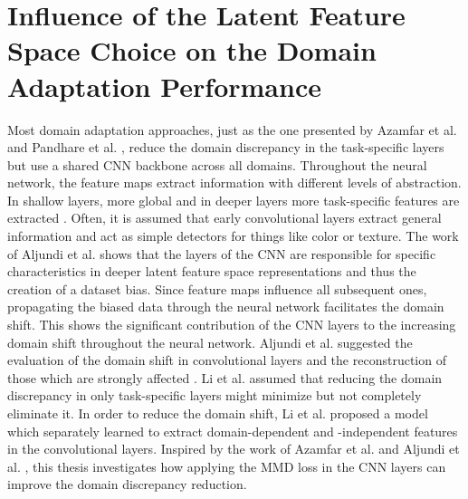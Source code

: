 \section{Influence of the Latent Feature Space Choice on the Domain Adaptation Performance}
Most domain adaptation approaches, just as the one presented by Azamfar et al. \cite{AZAMFAR2020103932} and Pandhare et al. \cite{Pandhare2021}, reduce the domain discrepancy in the task-specific layers but use a shared CNN backbone across all domains. Throughout the neural network, the feature maps extract information with different levels of abstraction. In shallow layers, more global and in deeper layers more task-specific features are extracted \cite{Aljundi2016}. Often, it is assumed that early convolutional layers extract general information and act as simple detectors for things like color or texture. The work of Aljundi et al. \cite{Aljundi2016} shows that the layers of the CNN are responsible for specific characteristics in deeper latent feature space representations and thus the creation of a dataset bias. Since feature maps influence all subsequent ones, propagating the biased data through the neural network facilitates the domain shift. This shows the significant contribution of the CNN layers to the increasing domain shift throughout the neural network. Aljundi et al. \cite{Aljundi2016} suggested the evaluation of the domain shift in convolutional layers and the reconstruction of those which are strongly affected \cite{Aljundi2016}. Li et al. \cite{li2020} assumed that reducing the domain discrepancy in only task-specific layers might minimize but not completely eliminate it. In order to reduce the domain shift, Li et al. \cite{li2020} proposed a model which separately learned to extract domain-dependent and -independent features in the convolutional layers. Inspired by the work of Azamfar et al. \cite{Aljundi2016} and Aljundi et al. \cite{Aljundi2016}, this thesis investigates how applying the MMD loss in the CNN layers can improve the domain discrepancy reduction.

